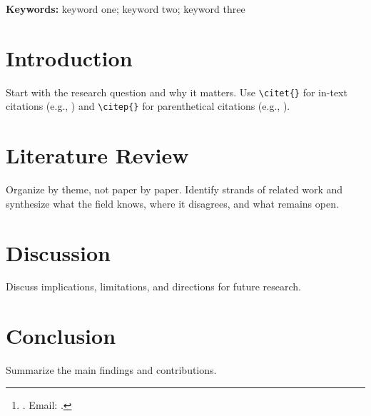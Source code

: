 \documentclass[12pt]{article}
\title{\papertitle}
\author{\paperauthor\thanks{\paperaffiliation. Email: \href{mailto:\paperemail}{\paperemail}.}}
\date{\today}
\begin{document}
\maketitle

\begin{abstract}
Replace this with your abstract.
\end{abstract}

\bigskip
\noindent \textbf{Keywords:} keyword one; keyword two; keyword three

\newpage

\section{Introduction}
\label{sec:intro}

Start with the research question and why it matters. Use \verb|\citet{}| for in-text citations (e.g., \citet{fama1993common}) and \verb|\citep{}| for parenthetical citations (e.g., \citep{petersen2009estimating}).

\section{Literature Review}
\label{sec:literature}

Organize by theme, not paper by paper. Identify strands of related work and synthesize what the field knows, where it disagrees, and what remains open.

\section{Discussion}
\label{sec:discussion}

Discuss implications, limitations, and directions for future research.

\section{Conclusion}
\label{sec:conclusion}

Summarize the main findings and contributions.



\end{document}
